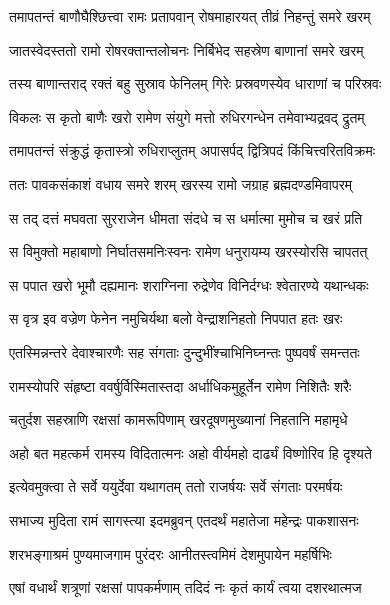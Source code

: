 \twolineshloka
{तमापतन्तं बाणौघैश्छित्त्वा रामः प्रतापवान्}
{रोषमाहारयत् तीव्रं निहन्तुं समरे खरम्} %

\twolineshloka
{जातस्वेदस्ततो रामो रोषरक्तान्तलोचनः}
{निर्बिभेद सहस्रेण बाणानां समरे खरम्} %

\twolineshloka
{तस्य बाणान्तराद् रक्तं बहु सुस्राव फेनिलम्}
{गिरेः प्रस्रवणस्येव धाराणां च परिस्रवः} %

\twolineshloka
{विकलः स कृतो बाणैः खरो रामेण संयुगे}
{मत्तो रुधिरगन्धेन तमेवाभ्यद्रवद् द्रुतम्} %

\twolineshloka
{तमापतन्तं संक्रुद्धं कृतास्त्रो रुधिराप्लुतम्}
{अपासर्पद् द्वित्रिपदं किंचित्त्वरितविक्रमः} %

\twolineshloka
{ततः पावकसंकाशं वधाय समरे शरम्}
{खरस्य रामो जग्राह ब्रह्मदण्डमिवापरम्} %

\twolineshloka
{स तद् दत्तं मघवता सुरराजेन धीमता}
{संदधे च स धर्मात्मा मुमोच च खरं प्रति} %

\twolineshloka
{स विमुक्तो महाबाणो निर्घातसमनिःस्वनः}
{रामेण धनुरायम्य खरस्योरसि चापतत्} %

\twolineshloka
{स पपात खरो भूमौ दह्यमानः शराग्निना}
{रुद्रेणेव विनिर्दग्धः श्वेतारण्ये यथान्धकः} %

\twolineshloka
{स वृत्र इव वज्रेण फेनेन नमुचिर्यथा}
{बलो वेन्द्राशनिहतो निपपात हतः खरः} %

\twolineshloka
{एतस्मिन्नन्तरे देवाश्चारणैः सह संगताः}
{दुन्दुभींश्चाभिनिघ्नन्तः पुष्पवर्षं समन्ततः} %

\twolineshloka
{रामस्योपरि संहृष्टा ववर्षुर्विस्मितास्तदा}
{अर्धाधिकमुहूर्तेन रामेण निशितैः शरैः} %

\twolineshloka
{चतुर्दश सहस्राणि रक्षसां कामरूपिणाम्}
{खरदूषणमुख्यानां निहतानि महामृधे} %

\twolineshloka
{अहो बत महत्कर्म रामस्य विदितात्मनः}
{अहो वीर्यमहो दार्ढ्यं विष्णोरिव हि दृश्यते} %

\twolineshloka
{इत्येवमुक्त्वा ते सर्वे ययुर्देवा यथागतम्}
{ततो राजर्षयः सर्वे संगताः परमर्षयः} %

\twolineshloka
{सभाज्य मुदिता रामं सागस्त्या इदमब्रुवन्}
{एतदर्थं महातेजा महेन्द्रः पाकशासनः} %

\twolineshloka
{शरभङ्गाश्रमं पुण्यमाजगाम पुरंदरः}
{आनीतस्त्वमिमं देशमुपायेन महर्षिभिः} %

\twolineshloka
{एषां वधार्थं शत्रूणां रक्षसां पापकर्मणाम्}
{तदिदं नः कृतं कार्यं त्वया दशरथात्मज} %

